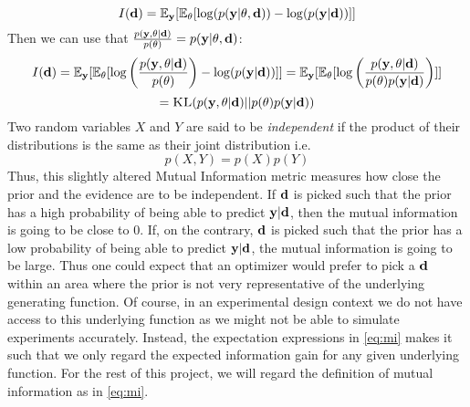\begin{equation} I(\mathbf{d})  = \mathbb{E}_{\mathbf{y}}[\mathbb{E}_{\theta} [\log(p(\mathbf{y} | \mathbf{\theta}, \mathbf{d})) - \log(p(\mathbf{y}|\mathbf{d}))]]\end{equation} 
Then we can use that $\frac{p(\mathbf{y}, \mathbf{\theta}|\mathbf{d})}{p(\theta)}=p(\mathbf{y| \theta, \mathbf{d}})$:
\begin{equation} I(\mathbf{d})  = \mathbb{E}_{\mathbf{y}}[\mathbb{E}_\theta [\log\left(\frac{p(\mathbf{y}, \mathbf{\theta}|\mathbf{d})}{p(\theta)}\right) - \log(p(\mathbf{y}|\mathbf{d}))]] = \mathbb{E}_{\mathbf{y}}[\mathbb{E}_\theta [\log\left(\frac{p(\mathbf{y}, \mathbf{\theta}|\mathbf{d})}{p(\theta)p(\mathbf{y}|\mathbf{d})}\right)]]\end{equation}
$$ = \textsc{KL}(p(\mathbf{y}, \theta | \mathbf{d})|| p(\theta)p(\mathbf{y}|\mathbf{d}))$$
Two random variables $X$ and $Y$ are said to be \textit{independent} if the product of their distributions is the same as their joint distribution i.e.
\begin{equation}p(X,Y) = p(X)p(Y)\end{equation}
Thus, this slightly altered Mutual Information metric measures how close the prior and the evidence are to be independent. 
If $\mathbf{d}$ is picked such that the prior has a high probability of being able to predict $\mathbf{y}|\mathbf{d}$, then the mutual information is going to be close to 0. 
If, on the contrary, $\mathbf{d}$ is picked such that the prior has a low probability of being able to predict $\mathbf{y}|\mathbf{d}$, the mutual information is going to be large.
Thus one could expect that an optimizer would prefer to pick a $\mathbf{d}$ within an area where the prior is not very representative of the underlying generating function.
Of course, in an experimental design context we do not have access to this underlying function as we might not be able to simulate experiments accurately. Instead, the expectation expressions in \ref{eq:mi}
makes it such that we only regard the expected information gain for any given underlying function.
For the rest of this project, we will regard the definition of mutual information as in \eqref{eq:mi}.

